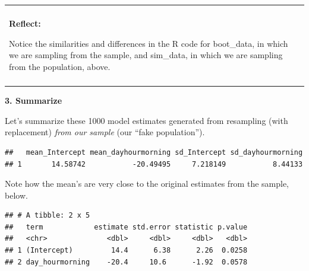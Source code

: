 \documentclass[
]{book}
\newenvironment{Shaded}{\begin{snugshade}}{\end{snugshade}}
\newcommand{\CommentTok}[1]{\textcolor[rgb]{0.56,0.35,0.01}{\textit{#1}}}
\newcommand{\DataTypeTok}[1]{\textcolor[rgb]{0.13,0.29,0.53}{#1}}
\newcommand{\KeywordTok}[1]{\textcolor[rgb]{0.13,0.29,0.53}{\textbf{#1}}}
\newcommand{\NormalTok}[1]{#1}
\newcommand{\OperatorTok}[1]{\textcolor[rgb]{0.81,0.36,0.00}{\textbf{#1}}}
\newcommand{\StringTok}[1]{\textcolor[rgb]{0.31,0.60,0.02}{#1}}
\newenvironment{reflect}
{
    \begin{center}
    
    \begin{tabular}{|p{0.8\textwidth}|}
    \rowcolor{LightBlue}
    \hline\\
    \rowcolor{LightBlue}
    \textbf{Reflect:}
}
{
    \\\rowcolor{LightBlue}
    \\\hline
    \end{tabular} 
    \end{center}
}
\begin{document}
\begin{reflect}
Notice the similarities and differences in the R code for boot\_data, in
which we are sampling from the sample, and sim\_data, in which we are
sampling from the population, above.
\end{reflect}

\textbf{3. Summarize}

Let's summarize these 1000 model estimates generated from resampling (with replacement) \emph{from our sample} (our ``fake population'').

\begin{Shaded}
\end{Shaded}

\begin{verbatim}
##   mean_Intercept mean_dayhourmorning sd_Intercept sd_dayhourmorning
## 1       14.58742           -20.49495     7.218149           8.44133
\end{verbatim}

Note how the mean's are very close to the original estimates from the sample, below.

\begin{Shaded}
\end{Shaded}

\begin{verbatim}
## # A tibble: 2 x 5
##   term            estimate std.error statistic p.value
##   <chr>              <dbl>     <dbl>     <dbl>   <dbl>
## 1 (Intercept)         14.4      6.38      2.26  0.0258
## 2 day_hourmorning    -20.4     10.6      -1.92  0.0578
\end{verbatim}
\end{document}
